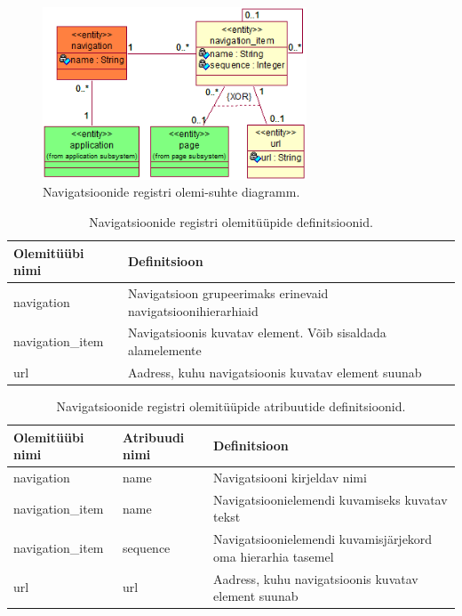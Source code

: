\documentclass[a4paper,12pt]{article} %
\begin{document}
\begin{figure}[H]
\centering
\includegraphics[width=0.7\textwidth]{./diagrams/navigation-er-diagram.png}
\caption{Navigatsioonide registri olemi-suhte diagramm.}
\label{fig_navigatsioonide_registri_olemi_suhte_diagramm}
\end{figure}

\begin{table}[H]
\centering
\caption{Navigatsioonide registri olemitüüpide definitsioonid.}
\label{table_er_navigatsioonide_registri_olemitüüpide_definitsioonid}
\begin{tabular}{|p{4cm}|p{11cm}|}
\hline
\rowcolor{rowgray}
Olemitüübi nimi & Definitsioon \\ \hline
navigation & Navigatsioon grupeerimaks erinevaid navigatsioonihierarhiaid \\ \hline
navigation\_item & Navigatsioonis kuvatav element. Võib sisaldada alamelemente \\ \hline
url & Aadress, kuhu navigatsioonis kuvatav element suunab \\ \hline
\end{tabular}
\end{table}

\begin{table}[H]
\centering
\caption{Navigatsioonide registri olemitüüpide atribuutide definitsioonid.}
\label{table_er_navigatsioonide_registri_olemitüüpide_atribuutide_definitsioonid}
\begin{tabular}{|p{4cm}|p{4cm}|p{7cm}|}
\hline
\rowcolor{rowgray}
Olemitüübi nimi & Atribuudi nimi & Definitsioon \\ \hline
navigation & name & Navigatsiooni kirjeldav nimi \\ \hline
navigation\_item & name & Navigatsioonielemendi kuvamiseks kuvatav tekst \\ \hline
navigation\_item & sequence & Navigatsioonielemendi kuvamisjärjekord oma hierarhia tasemel \\ \hline
url & url & Aadress, kuhu navigatsioonis kuvatav element suunab \\ \hline
\end{tabular}
\end{table}
\end{document}
